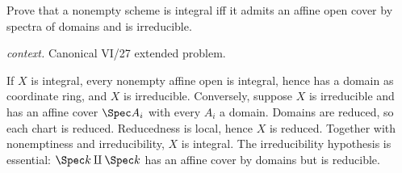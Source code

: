 \begin{problem}\label{prob:vi27-p05}
Prove that a nonempty scheme is integral iff it admits an affine open cover by spectra of domains and is irreducible.
\par\smallskip\noindent\textit{context.} Canonical VI/27 extended problem.
\end{problem}

\ifdefined\FullProblemDossiers
\begin{solution}
If \(X\) is integral, every nonempty affine open is integral, hence has a domain as coordinate ring, and \(X\)
is irreducible. Conversely, suppose \(X\) is irreducible and has an affine cover \(\Spec A_i\) with every \(A_i\)
a domain. Domains are reduced, so each chart is reduced. Reducedness is local, hence \(X\) is reduced. Together
with nonemptiness and irreducibility, \(X\) is integral. The irreducibility hypothesis is essential:
\(\Spec k\amalg\Spec k\) has an affine cover by domains but is reducible.
\end{solution}
\fi
